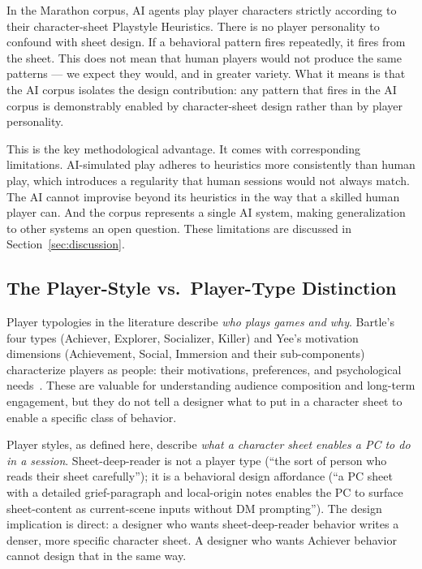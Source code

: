In the Marathon corpus, AI agents play player characters strictly according to their
character-sheet Playstyle Heuristics. There is no player personality to confound with
sheet design. If a behavioral pattern fires repeatedly, it fires from the sheet. This
does not mean that human players would not produce the same patterns --- we expect
they would, and in greater variety. What it means is that the AI corpus isolates the
design contribution: any pattern that fires in the AI corpus is demonstrably enabled
by character-sheet design rather than by player personality.

This is the key methodological advantage. It comes with corresponding limitations.
AI-simulated play adheres to heuristics more consistently than human play, which
introduces a regularity that human sessions would not always match. The AI cannot
improvise beyond its heuristics in the way that a skilled human player can. And the
corpus represents a single AI system, making generalization to other systems an open
question. These limitations are discussed in Section~\ref{sec:discussion}.

\subsection{The Player-Style vs.\ Player-Type Distinction}

Player typologies in the literature describe \textit{who plays games and why}. Bartle's
four types (Achiever, Explorer, Socializer, Killer) and Yee's motivation dimensions
(Achievement, Social, Immersion and their sub-components) characterize players as
people: their motivations, preferences, and psychological needs~\cite{bartle1996hearts,
yee2006motivations}. These are valuable for understanding audience composition and
long-term engagement, but they do not tell a designer what to put in a character sheet
to enable a specific class of behavior.

Player styles, as defined here, describe \textit{what a character sheet enables a PC
to do in a session}. Sheet-deep-reader is not a player type (``the sort of person who
reads their sheet carefully''); it is a behavioral design affordance (``a PC sheet
with a detailed grief-paragraph and local-origin notes enables the PC to surface
sheet-content as current-scene inputs without DM prompting''). The design implication
is direct: a designer who wants sheet-deep-reader behavior writes a denser, more
specific character sheet. A designer who wants Achiever behavior cannot design that
in the same way.

